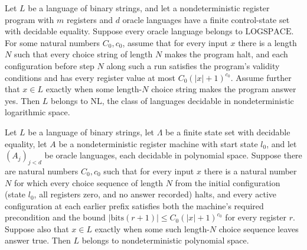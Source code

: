 \begin{theorem}
\label{Complexity.LogProg.narm_decides_poly}
\leanok
{}
Let $L$ be a language of binary strings, and let a nondeterministic register program
with $m$ registers and $d$ oracle languages have a finite control-state set with
decidable equality. Suppose every oracle language belongs to $\text{LOGSPACE}$. For some
natural numbers $C_0,c_0$, assume that for every input $x$ there is a length $N$ such
that every choice string of length $N$ makes the program halt, and each configuration
before step $N$ along such a run satisfies the program's validity conditions and has
every register value at most $C_0(|x|+1)^{c_0}$. Assume further that $x\in L$ exactly
when some length-$N$ choice string makes the program answer yes. Then $L$ belongs to
$\text{NL}$, the class of languages decidable in nondeterministic logarithmic space.
\end{theorem}

\begin{theorem}
\label{Complexity.LogProg.narm_decides_npspace}
\leanok
{}
Let $L$ be a language of binary strings, let $\Lambda$ be a finite state set with
decidable equality, let $A$ be a nondeterministic register machine with start state
$l_0$, and let $(A_j)_{j<d}$ be oracle languages, each decidable in polynomial space.
Suppose there are natural numbers $C_0,c_0$ such that for every input $x$ there is a
natural number $N$ for which every choice sequence of length $N$ from the initial
configuration (state $l_0$, all registers zero, and no answer recorded) halts, and every
active configuration at each earlier prefix satisfies both the machine's required
precondition and the bound $|\mathrm{bits}(r+1)|\le C_0(|x|+1)^{c_0}$ for every register
$r$. Suppose also that $x\in L$ exactly when some such length-$N$ choice sequence leaves
answer true. Then $L$ belongs to nondeterministic polynomial space.
\end{theorem}


